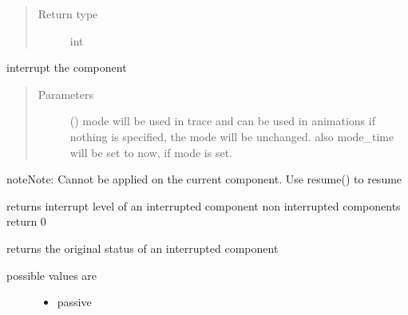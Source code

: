 \documentclass[letterpaper,10pt,english]{sphinxmanual}
\begin{document}
\begin{fulllineitems}
\begin{fulllineitems}
\begin{quote}
\begin{description}
\item[{Return type}] \leavevmode
int

\end{description}\end{quote}

\end{fulllineitems}


\begin{fulllineitems}
\label{\detokenize{Reference:salabim.Component.interrupt}}
interrupt the component
\begin{quote}\begin{description}
\item[{Parameters}] \leavevmode
{} () \textendash{} mode 
will be used in trace and can be used in animations 
if nothing is specified, the mode will be unchanged. 
also mode\_time will be set to now, if mode is set.

\end{description}\end{quote}

\begin{sphinxadmonition}{note}{Note:}
Cannot be applied on the current component. 
Use resume() to resume
\end{sphinxadmonition}

\end{fulllineitems}


\begin{fulllineitems}
\label{\detokenize{Reference:salabim.Component.interrupt_level}}
returns interrupt level of an interrupted component 
non interrupted components return 0

\end{fulllineitems}


\begin{fulllineitems}
\label{\detokenize{Reference:salabim.Component.interrupted_status}}
returns the original status of an interrupted component
\begin{description}
\item[{possible values are}] \leavevmode\begin{itemize}
\item {} 
passive


\end{itemize}
\end{description}
\end{fulllineitems}
\end{fulllineitems}
\end{document}
